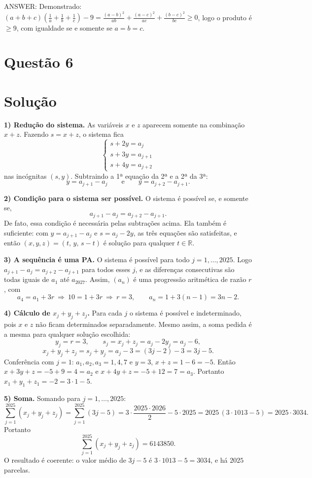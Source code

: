 \documentclass{article}%
\begin{document}
ANSWER: Demonstrado: $(a+b+c)\left(\frac1a+\frac1b+\frac1c\right)-9=\frac{(a-b)^2}{ab}+\frac{(a-c)^2}{ac}+\frac{(b-c)^2}{bc}\ge 0$, logo o produto é $\ge 9$, com igualdade se e somente se $a=b=c$.%
\newpage%
\section*{Questão 6}

\section*{Solução}

\textbf{1) Redução do sistema.} As variáveis $x$ e $z$ aparecem somente na combinação $x+z$. Fazendo $s=x+z$, o sistema fica
\[
\begin{cases} s+2y=a_j\\ s+3y=a_{j+1}\\ s+4y=a_{j+2}\end{cases}
\]
nas incógnitas $(s,y)$. Subtraindo a 1ª equação da 2ª e a 2ª da 3ª:
\[
y=a_{j+1}-a_j \qquad\text{e}\qquad y=a_{j+2}-a_{j+1}.
\]

\textbf{2) Condição para o sistema ser possível.} O sistema é possível se, e somente se,
\[
a_{j+1}-a_j=a_{j+2}-a_{j+1}.
\]
De fato, essa condição é necessária pelas subtrações acima. Ela também é suficiente: com $y=a_{j+1}-a_j$ e $s=a_j-2y$, as três equações são satisfeitas, e então $(x,y,z)=(t,\,y,\,s-t)$ é solução para qualquer $t\in\mathbb{R}$.

\textbf{3) A sequência é uma PA.} O sistema é possível para todo $j=1,\ldots,2025$. Logo $a_{j+1}-a_j=a_{j+2}-a_{j+1}$ para todos esses $j$, e as diferenças consecutivas são todas iguais de $a_1$ até $a_{2027}$. Assim, $(a_n)$ é uma progressão aritmética de razão $r$, com
\[
a_4=a_1+3r\ \Rightarrow\ 10=1+3r\ \Rightarrow\ r=3,\qquad a_n=1+3(n-1)=3n-2 .
\]

\textbf{4) Cálculo de $x_j+y_j+z_j$.} Para cada $j$ o sistema é possível e indeterminado, pois $x$ e $z$ não ficam determinados separadamente. Mesmo assim, a soma pedida é a mesma para qualquer solução escolhida:
\[
y_j=r=3,\qquad s_j=x_j+z_j=a_j-2y_j=a_j-6,
\]
\[
x_j+y_j+z_j=s_j+y_j=a_j-3=(3j-2)-3=3j-5 .
\]
Conferência com $j=1$: $a_1,a_2,a_3=1,4,7$ e $y=3$, $x+z=1-6=-5$. Então $x+3y+z=-5+9=4=a_2$ e $x+4y+z=-5+12=7=a_3$. Portanto $x_1+y_1+z_1=-2=3\cdot1-5$.

\textbf{5) Soma.} Somando para $j=1,\ldots,2025$:
\[
\sum_{j=1}^{2025}(x_j+y_j+z_j)=\sum_{j=1}^{2025}(3j-5)
=3\cdot\frac{2025\cdot 2026}{2}-5\cdot 2025
=2025\,(3\cdot 1013-5)=2025\cdot 3034 .
\]
Portanto
\[
\sum_{j=1}^{2025}(x_j+y_j+z_j)=6143850 .
\]
O resultado é coerente: o valor médio de $3j-5$ é $3\cdot 1013-5=3034$, e há $2025$ parcelas.
\end{document}
